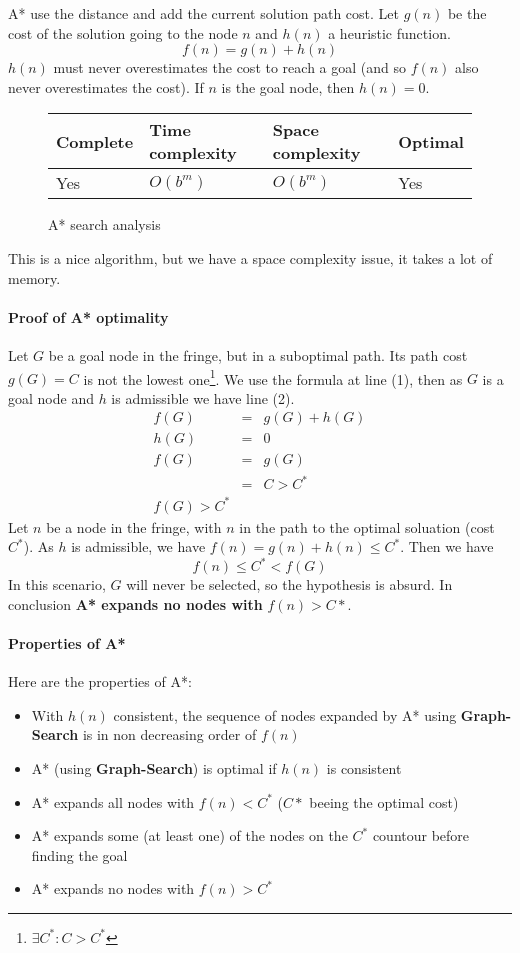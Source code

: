 A* use the distance and add the current solution path cost. Let $g(n)$ be the cost of the solution going to the node $n$ and $h(n)$ a heuristic function.
$$f(n) = g(n) + h(n)$$
$h(n)$ must never overestimates the cost to reach a goal (and so $f(n)$ also never overestimates the cost). If $n$ is the goal node, then $h(n) = 0$.

\begin{figure}[h]
\centering
\begin{tabular}{|llll|}
\hline
\textbf{Complete} & \textbf{Time complexity} & \textbf{Space complexity} & \textbf{Optimal} \\
\hline
Yes & $O(b^m)$ & $O(b^m)$ & Yes\\
\hline
\end{tabular}
\caption{A* search analysis}
\end{figure}

This is a nice algorithm, but we have a space complexity issue, it takes a lot of memory.

\paragraph{Proof of A* optimality}

Let $G$ be a goal node in the fringe, but in a suboptimal path. Its path cost $g(G)=C$ is not the lowest one\footnote{$\exists C^* : C > C^*$}. We use the formula at line (1), then as $G$ is a goal node and $h$ is admissible we have line (2). 
\begin{eqnarray}
f(G) &=& g(G) + h(G)\\
h(G) &=& 0\\
f(G) &=& g(G)\\
&=& C > C^*\\
f(G) > C^*
\end{eqnarray}
Let $n$ be a node in the fringe, with $n$ in the path to the optimal soluation (cost $C^*$). As $h$ is admissible, we have $f(n) = g(n) + h(n) \leq C^*$. Then we have
$$f(n) \leq C^* < f(G)$$
In this scenario, $G$ will never be selected, so the hypothesis is absurd. In conclusion \textbf{A* expands no nodes with} $f(n) > C*$.
\paragraph{Properties of A*}

Here are the properties of A*:
\begin{itemize}
\item With $h(n)$ consistent, the sequence of nodes expanded by A* using \textbf{Graph-Search} is in non decreasing order of $f(n)$
\item A* (using \textbf{Graph-Search}) is optimal if $h(n)$ is consistent
\item A* expands all nodes with $f(n) < C^*$ ($C*$ beeing the optimal cost)
\item A* expands some (at least one) of the nodes on the $C^*$ countour before finding the goal
\item A* expands no nodes with $f(n) > C^*$ 
\end{itemize}


